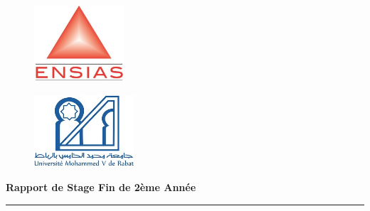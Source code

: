 \documentclass[a4paper]{report}
\begin{document}
\begin{titlepage}
    \begin{center}
        \begin{figure}[!h]
            \vspace{- 2 cm}
            \hspace{ 0 cm}
            \includegraphics[width=9em]{images/ensias.jpeg}
        \end{figure}
        \begin{figure}[!h]
            \vspace{- 3.34cm}
            \hspace{14 cm}
            \includegraphics[width=10em]{images/um5.jpeg}
        \end{figure}
    \end{center}

    \begin{center}
        \noindent \hspace{ 0.3 cm }\Huge \textbf{Rapport de Stage Fin de 2ème Année}
        \vspace*{0.1cm}

        \vspace*{0.1cm}
        \begin{center}
            \rule{0.9\linewidth}{1pt}
        \end{center}
        \begin{center}

            \noindent {} \\
        \end{center}



\end{center}
\end{titlepage}
\end{document}
